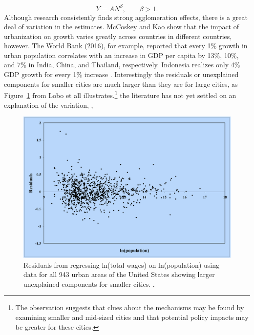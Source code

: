 \begin{equation}\label{eq-agglom-eqn2}
    Y=AN^\beta,\qquad \beta>1. 
\end{equation}
Although research consistently finds strong agglomeration effects, there is a great deal of variation in the estimates. McCoskey and Kao \cite{mccoskeyPanelDataInvestigation} show that the impact of urbanization on growth varies greatly across countries in different countries, however. The World Bank (2016), for example, reported that every 1\% growth in urban population correlates with an increase in GDP per capita by 13\%, 10\%, and 7\% in India, China, and Thailand, respectively. Indonesia realizes only 4\% GDP growth for every 1\% increase \cite{haryantotriRelationshipUrbanizationEducation2021}. Interestingly the residuals or unexplained components for smaller cities are much larger than they are for large cities, as Figure~\ref{fig-residuals-lobo} from Lobo et all \cite{loboUrbanScalingProduction2013} illustrates.\footnote{The observation suggests that clues about the mechanisms may be found by examining smaller and mid-sized cities and that potential policy impacts may be greater for these cities.} the literature has not yet settled on an explanation of the variation,  \cite{loboUrbanScalingProduction2013}, \cite{pugaMagnitudeCausesAgglomeration2010}



\begin{figure}[h!tb]
\centering
\includegraphics[scale=0.30]{fig/residuals-lobo.png}
\caption{Residuals from regressing ln(total wages) on ln(population) using data for all 943 urban areas of the United States showing larger unexplained components for smaller cities. \cite{loboUrbanScalingProduction2013}.}
\label{fig-residuals-lobo}
\end{figure}


